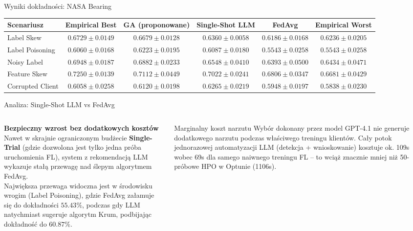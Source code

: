\documentclass[9pt,aspectratio=169]{beamer}
\begin{document}
\begin{frame}{Wyniki dokładności: NASA Bearing}
\centering\scriptsize
\renewcommand{\arraystretch}{1.35}
\begin{tabular}{lccccc}
\toprule
\textbf{Scenariusz} & \textbf{Empirical Best} & \textbf{GA (proponowane)} & \textbf{Single-Shot LLM} & \textbf{FedAvg} & \textbf{Empirical Worst}\\
\midrule
Label Skew      & $0.6729\pm0.0149$ & \cellcolor{lightgray}$0.6679\pm0.0128$ & $0.6360\pm0.0058$ & $0.6186\pm0.0168$ & $0.6236\pm0.0205$\\
Label Poisoning & $0.6060\pm0.0168$ & \cellcolor{lightgray}$0.6223\pm0.0195$ & $0.6087\pm0.0180$ & $0.5543\pm0.0258$ & $0.5543\pm0.0258$\\
Noisy Label     & $0.6948\pm0.0187$ & \cellcolor{lightgray}$0.6882\pm0.0233$ & $0.6548\pm0.0410$ & $0.6393\pm0.0500$ & $0.6434\pm0.0471$\\
Feature Skew    & $0.7250\pm0.0139$ & \cellcolor{lightgray}$0.7112\pm0.0449$ & $0.7022\pm0.0241$ & $0.6806\pm0.0347$ & $0.6681\pm0.0429$\\
Corrupted Client& $0.6058\pm0.0258$ & \cellcolor{lightgray}$0.6120\pm0.0198$ & $0.6265\pm0.0219$ & $0.5948\pm0.0197$ & $0.5838\pm0.0230$\\
\bottomrule
\end{tabular}
\end{frame}

\begin{frame}{Analiza: Single-Shot LLM vs FedAvg}
\begin{columns}[T]
\begin{column}{0.5\textwidth}
\textbf{Bezpieczny wzrost bez dodatkowych kosztów}\\[4pt]
Nawet w skrajnie ograniczonym budżecie \textbf{Single-Trial} (gdzie dozwolona jest tylko jedna próba uruchomienia FL), system z rekomendacją LLM wykazuje stałą przewagę nad ślepym algorytmem FedAvg.\\[6pt]
Największa przewaga widoczna jest w środowisku wrogim (Label Poisoning), gdzie FedAvg załamuje się do dokładności $55.43\%$, podczas gdy LLM natychmiast sugeruje algorytm Krum, podbijając dokładność do $60.87\%$.
\end{column}
\begin{column}{0.5\textwidth}
\begin{infoboxgreen}{Marginalny koszt narzutu}
Wybór dokonany przez model GPT-4.1 nie generuje dodatkowego narzutu podczas właściwego treningu klientów. Cały potok jednorazowej automatyzacji LLM (detekcja + wnioskowanie) kosztuje ok. 109s wobec 69s dla samego naiwnego treningu FL -- to wciąż znacznie mniej niż 50-próbowe HPO w Optunie (1106s).
\end{infoboxgreen}
\end{column}
\end{columns}
\end{frame}
\end{document}
